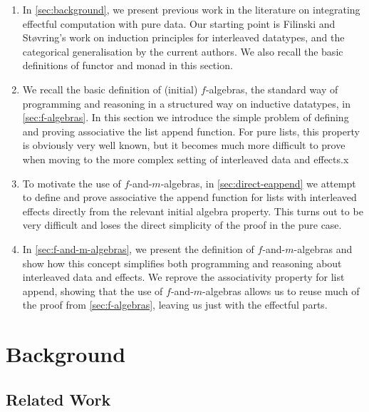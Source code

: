 \begin{enumerate}
\item In \autoref{sec:background}, we present previous work in the
  literature on integrating effectful computation with pure data. Our
  starting point is Filinski and St\o{}vring's work on induction
  principles for interleaved datatypes, and the categorical
  generalisation by the current authors. We also recall the basic
  definitions of functor and monad in this section.
\item We recall the basic definition of (initial) $f$-algebras, the standard way
  of programming and reasoning in a structured way on inductive
  datatypes, in \autoref{sec:f-algebras}. In this section we introduce
  the simple problem of defining and proving associative the list
  append function. For pure lists, this property is obviously very
  well known, but it becomes much more difficult to prove when moving
  to the more complex setting of interleaved data and effects.x
\item To motivate the use of $f$-and-$m$-algebras, in
  \autoref{sec:direct-eappend} we attempt to define and prove
  associative the append function for lists with interleaved effects
  directly from the relevant initial algebra property. This turns out
  to be very difficult and loses the direct simplicity of the proof in
  the pure case.
\item In \autoref{sec:f-and-m-algebras}, we present the definition of
  $f$-and-$m$-algebras and show how this concept simplifies both
  programming and reasoning about interleaved data and effects. We
  reprove the associativity property for list append, showing that the
  use of $f$-and-$m$-algebras allows us to reuse much of the proof
  from \autoref{sec:f-algebras}, leaving us just with the effectful
  parts.
\end{enumerate}

\section{Background}
\label{sec:background}

\subsection{Related Work}

